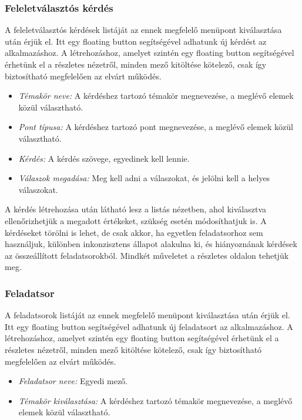 \subsubsection{Feleletválasztós kérdés}

A feleletválasztós kérdések listáját az ennek megfelelő menüpont kiválasztása után érjük el.
Itt egy floating button segítségével adhatunk új kérdést az alkalmazáshoz.
A létrehozáshoz, amelyet szintén egy floating button segítségével érhetünk el a részletes nézetről, minden mező kitöltése kötelező, csak így biztosítható megfelelően az elvárt működés.

\begin{itemize}
    \item \emph{Témakör neve:} A kérdéshez tartozó témakör megnevezése, a meglévő elemek közül választható.
    \item \emph{Pont típusa:} A kérdéshez tartozó pont megnevezése, a meglévő elemek közül választható.
    \item \emph{Kérdés:} A kérdés szövege, egyedinek kell lennie.
    \item \emph{Válaszok megadása:} Meg kell adni a válaszokat, és jelölni kell a helyes válaszokat.
\end{itemize}

A kérdés létrehozása után látható lesz a listás nézetben, ahol kiválasztva ellenőrizhetjük a megadott értékeket, szükség esetén módosíthatjuk is.
A kérdéseket törölni is lehet, de csak akkor, ha egyetlen feladatsorhoz sem használjuk, különben inkonzisztens állapot alakulna ki, és hiányoznának kérdések az összeállított feladatsorokból.
Mindkét műveletet a részletes oldalon tehetjük meg.

\subsubsection{Feladatsor}
\label{sec:SpecificationExamDescription}

A feladatsorok listáját az ennek megfelelő menüpont kiválasztása után érjük el.
Itt egy floating button segítségével adhatunk új feladatsort az alkalmazáshoz.
A létrehozáshoz, amelyet szintén egy floating button segítségével érhetünk el a részletes nézetről, minden mező kitöltése kötelező, csak így biztosítható megfelelően az elvárt működés.

\begin{itemize}
    \item \emph{Feladatsor neve:} Egyedi mező.
    \item \emph{Témakör kiválasztása:} A kérdéshez tartozó témakör megnevezése, a meglévő elemek közül választható.
\end{itemize}


